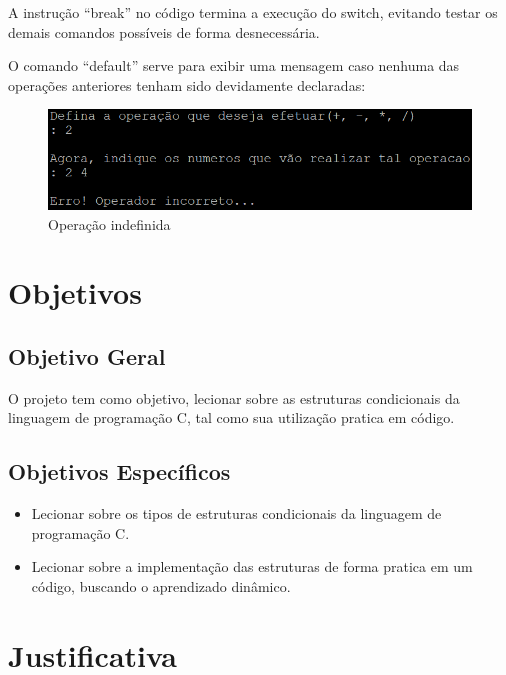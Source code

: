 \documentclass[a4paper,12pt]{article}  %
\begin{document}
     A instrução “break” no código termina a execução do switch, evitando testar os demais comandos possíveis de forma desnecessária. \par
   
     O comando “default” serve para exibir uma mensagem caso nenhuma das operações anteriores tenham sido devidamente declaradas:


 \begin{figure}[H]
 \centering
 \includegraphics[width=.80\linewidth]{imagens/ex7.png}
 \caption{Operação indefinida}
\end{figure}


\section{Objetivos}

 \subsection{Objetivo Geral}

   O projeto tem como objetivo, lecionar sobre as estruturas condicionais da linguagem de programação C, tal como sua utilização pratica em código. 

 \subsection{Objetivos Específicos}

\begin{itemize}
 \item Lecionar sobre os tipos de estruturas condicionais da linguagem de programação C.
 \item Lecionar sobre a implementação das estruturas de forma pratica em um código, buscando o aprendizado dinâmico.  
\end{itemize}


\section{Justificativa}
\end{document}
